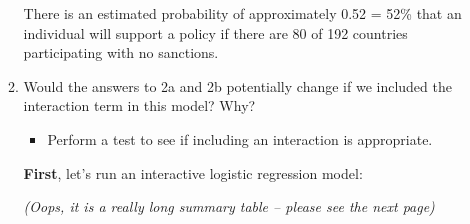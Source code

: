 \documentclass[12pt,letterpaper]{article}
\begin{document}
\begin{enumerate}
\begin{enumerate}
There is an estimated probability of approximately 0.52 = 52\% that an individual will support a policy if there are 80 of 192 countries participating with no sanctions.
	
		\item
		
		Would the answers to 2a and 2b potentially change if we included the interaction term in this model? Why? 
		\begin{itemize}
			\item Perform a test to see if including an interaction is appropriate.
		\end{itemize}
		
\textbf{First}, let's run an interactive logistic regression model: 

	 
	
\textit{	(Oops, it is a really long summary table -- please see the next page)}


\end{enumerate}
\end{enumerate}
\end{document}

